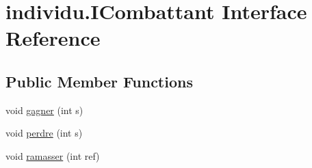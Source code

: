 \hypertarget{interfaceindividu_1_1_i_combattant}{\section{individu.\-I\-Combattant Interface Reference}
\label{interfaceindividu_1_1_i_combattant}
}
\subsection*{Public Member Functions}
\begin{DoxyCompactItemize}
\item 
void \hyperlink{interfaceindividu_1_1_i_combattant_afc181590bc6e778095a5770eaedcf0e8}{gagner} (int s)
\item 
void \hyperlink{interfaceindividu_1_1_i_combattant_a33f8a7c34f8d978f9908364c1dfb4646}{perdre} (int s)
\item 
void \hyperlink{interfaceindividu_1_1_i_combattant_ac7c356a747f5d5fc17142efae48c72c5}{ramasser} (int ref)
\end{DoxyCompactItemize}


